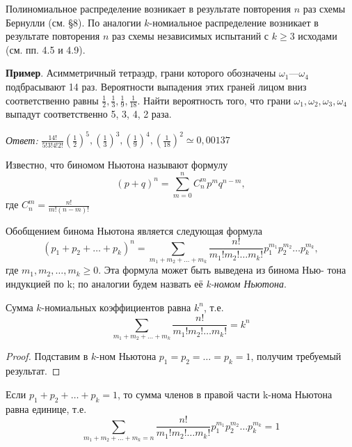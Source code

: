 
Полиномиальное распределение возникает в результате повторения $n$ раз
схемы Бернулли (см. §8). По аналогии $k$-номиальное распределение возникает в результате повторения $n$ раз схемы независимых испытаний с $k \geqslant 3$
исходами (см. пп. 4.5 и 4.9).

\textbf{Пример}. Асимметричный тетраэдр, грани которого обозначены $\omega_1$---$\omega_4$ подбрасывают 14 раз. Вероятности выпадения этих граней лицом вниз
соответственно равны $\frac{1}{2},\frac{1}{3},\frac{1}{9},\frac{1}{18}$. Найти вероятность того, что грани $\omega_1, \omega_2, \omega_3, \omega_4$ выпадут соответственно 5, 3, 4, 2 раза.

\textit{Ответ: }$\frac{14!}{5!3!4!2!}(\frac{1}{2})^5,(\frac{1}{3})^3,(\frac{1}{9})^4,(\frac{1}{18})^2\simeq0,00137$

\begin{zam}
\label{zam:9.1}
	Известно, что биномом Ньютона называют формулу
	\begin{equation*}
		(p+q)^n	=\sum\limits^n_{m=0}C_n^mp^mq^{n-m},
	\end{equation*}
	где $C_n^m=\frac{n!}{m!(n-m)!}$


Обобщением бинома Ньютона является следующая формула
\begin{equation*}
	(p_1+p_2+\ldots+ p_k)^n=\sum\limits_{m_1+m_2+\ldots+m_k}\frac{n!}{m_1!m_2!\ldots m_k!}p_1^{m_1}p_2^{m_2}\ldots p_k^{m_k},
\end{equation*}
где $m_1, m_2,\ldots, m_k \geqslant 0$. Эта формула может быть выведена из бинома Нью-
тона индукцией по k; по аналогии будем назвать её \textit{k-номом Ньютона}.

\end{zam}

\begin{lemma}
\label{lemma:9.2}

	Сумма $k$-номиальных коэффициентов равна $k^n$, т.е.
	\begin{equation*}
		\sum\limits_{m_1+m_2+\ldots+m_k}\frac{n!}{m_1!m_2!\ldots m_k!}=k^n
	\end{equation*}

\end{lemma}

\begin{proof}
Подставим в $k$-ном Ньютона $p_1 = p_2 = \ldots = p_k = 1$,
получим требуемый результат.
\end{proof}

\begin{lemma}
\label{lemma:9.3}

	Если $p_1+p_2+\ldots+p_k = 1$, то сумма членов в правой части
k-нома Ньютона равна единице, т.е.
\begin{equation*}
	\sum\limits_{m_1+m_2+\ldots+m_k=n}\frac{n!}{m_1!m_2!\ldots m_k!}p_1^{m_1}p_2^{m_2}\ldots p_k^{m_k}=1
\end{equation*}
\end{lemma}

